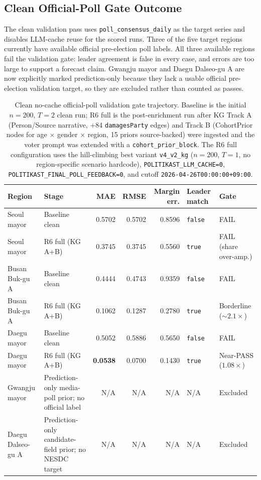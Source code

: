 \documentclass[11pt]{article}
\begin{document}
\subsection{Clean Official-Poll Gate Outcome}

The clean validation pass uses \texttt{poll\_consensus\_daily} as the target series and disables LLM-cache reuse for the scored runs. Three of the five target regions currently have available official pre-election poll labels. All three available regions fail the validation gate: leader agreement is false in every case, and errors are too large to support a forecast claim. Gwangju mayor and Daegu Dalseo-gu A are now explicitly marked prediction-only because they lack a usable official pre-election validation target, so they are excluded rather than counted as passes.

\begin{table}[h]
\centering
\caption{Clean no-cache official-poll validation gate trajectory. Baseline is the initial $n{=}200$, $T{=}2$ clean run; R6 full is the post-enrichment run after KG Track A (Person/Source narrative, +84 \texttt{damagesParty} edges) and Track B (CohortPrior nodes for age $\times$ gender $\times$ region, 15 priors source-backed) were ingested and the voter prompt was extended with a \texttt{cohort\_prior\_block}. The R6 full configuration uses the hill-climbing best variant \texttt{v4\_v2\_kg} ($n{=}200$, $T{=}1$, no region-specific scenario hardcode), \texttt{POLITIKAST\_LLM\_CACHE=0}, \texttt{POLITIKAST\_FINAL\_POLL\_FEEDBACK=0}, and cutoff \texttt{2026-04-26T00:00:00+09:00}.}
\label{tab:clean-validation-gate}
\scriptsize
\setlength{\tabcolsep}{3pt}
\begin{tabularx}{\textwidth}{L{0.18\textwidth}L{0.20\textwidth}rrrL{0.09\textwidth}L{0.11\textwidth}}
\toprule
Region & Stage & MAE & RMSE & Margin err. & Leader match & Gate \\
\midrule
Seoul mayor & Baseline clean & 0.5702 & 0.5702 & 0.8596 & \texttt{false} & FAIL \\
Seoul mayor & R6 full (KG A+B) & 0.3745 & 0.3745 & 0.5560 & \texttt{true} & FAIL (share over-amp.) \\
Busan Buk-gu A & Baseline clean & 0.4444 & 0.4743 & 0.9359 & \texttt{false} & FAIL \\
Busan Buk-gu A & R6 full (KG A+B) & 0.1062 & 0.1287 & 0.2780 & \texttt{true} & Borderline ($\sim 2.1\times$) \\
Daegu mayor & Baseline clean & 0.5052 & 0.5886 & 0.5650 & \texttt{false} & FAIL \\
Daegu mayor & R6 full (KG A+B) & \textbf{0.0538} & 0.0700 & 0.1430 & \texttt{true} & Near-PASS ($1.08\times$) \\
Gwangju mayor & Prediction-only media-poll prior; no official label & N/A & N/A & N/A & N/A & Excluded \\
Daegu Dalseo-gu A & Prediction-only candidate-field prior; no NESDC target & N/A & N/A & N/A & N/A & Excluded \\
\bottomrule
\end{tabularx}
\end{table}
\end{document}
